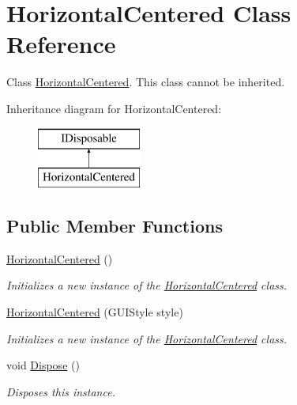 \hypertarget{class_horizontal_centered}{}\section{Horizontal\+Centered Class Reference}
\label{class_horizontal_centered}


Class \hyperlink{class_horizontal_centered}{Horizontal\+Centered}. This class cannot be inherited.  


Inheritance diagram for Horizontal\+Centered\+:\begin{figure}[H]
\begin{center}
\leavevmode
\includegraphics[height=2.000000cm]{class_horizontal_centered}
\end{center}
\end{figure}
\subsection*{Public Member Functions}
\begin{DoxyCompactItemize}
\item 
\hyperlink{class_horizontal_centered_a2739867182ed848a075d5a5878ba1638}{Horizontal\+Centered} ()
\begin{DoxyCompactList}\small\item\em Initializes a new instance of the \hyperlink{class_horizontal_centered}{Horizontal\+Centered} class. \end{DoxyCompactList}\item 
\hyperlink{class_horizontal_centered_a45e944344beec9d95e42d604bc9b9771}{Horizontal\+Centered} (G\+U\+I\+Style style)
\begin{DoxyCompactList}\small\item\em Initializes a new instance of the \hyperlink{class_horizontal_centered}{Horizontal\+Centered} class. \end{DoxyCompactList}\item 
void \hyperlink{class_horizontal_centered_ae1df0c563467fff386f86b1e42115fb8}{Dispose} ()
\begin{DoxyCompactList}\small\item\em Disposes this instance. \end{DoxyCompactList}\end{DoxyCompactItemize}


